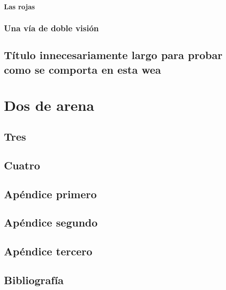 \documentclass[draft]{qx-files/qx-book}
\begin{document}
\subsection{Las rojas}

\lipsum[1]

\section{Una vía de doble visión}

\lipsum

\chapter[Título largo]{Título innecesariamente largo para probar como se comporta en esta wea}
\lipsum


\part{Dos de arena}

\chapter{Tres}
\lipsum


\chapter{Cuatro}
\lipsum[1]

\appendix

\chapter{Apéndice primero}


\lipsum[1]

\chapter{Apéndice segundo}


\lipsum[1]

\chapter{Apéndice tercero}


\lipsum[1]

\backmatter

\chapter{Bibliografía}

\lipsum
\end{document}
